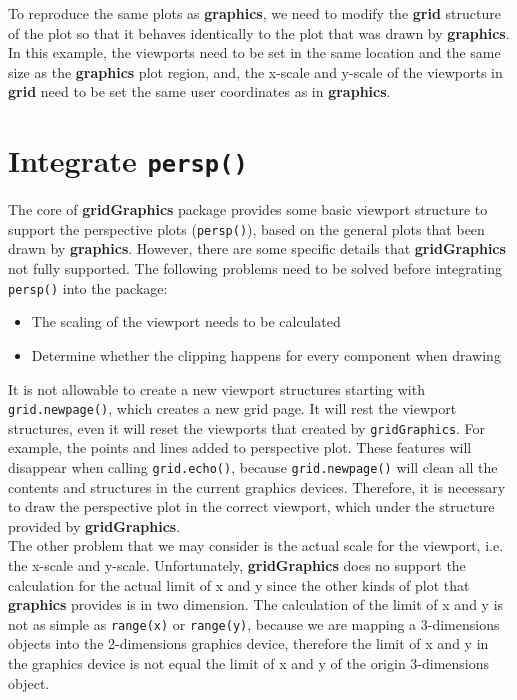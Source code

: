 \documentclass[11pt,twoside]{report}
\begin{document}
To reproduce the same plots as \textbf{graphics}, we need to modify the \textbf{grid} structure of the plot so that it behaves identically to the plot that was drawn by \textbf{graphics}. In this example, the viewports need to be set in the same location and the same size as the \textbf{graphics} plot region, and, the x-scale and y-scale of the viewports in \textbf{grid} need to be set the same user coordinates as in \textbf{graphics}.\\

\section{Integrate \texttt{persp()}}
The core of \textbf{gridGraphics} package provides some basic viewport structure to support the perspective plots (\texttt{persp()}), based on the general plots that been drawn by \textbf{graphics}. However, there are some specific details that \textbf{gridGraphics} not fully supported.
The following problems need to be solved before integrating \texttt{persp()} into the package:
\begin{itemize}
	\item{The scaling of the viewport needs to be calculated}
	\item{Determine whether the clipping happens for every component when drawing}
\end{itemize}

It is not allowable to create a new viewport structures starting with \texttt{grid.newpage()}, which creates a new grid page. It will rest the viewport structures, even it will reset the viewports that created by \texttt{gridGraphics}.
For example, the points and lines added to perspective plot. These features will disappear when calling \texttt{grid.echo()}, because \texttt{grid.newpage()} will clean all the contents and structures in the current graphics devices. Therefore, it is necessary to draw the perspective plot in the correct viewport, which under the structure provided by \textbf{gridGraphics}.\\

The other problem that we may consider is the actual scale for the viewport, i.e. the x-scale and y-scale. Unfortunately, \textbf{gridGraphics} does no support the calculation for the actual limit of x and y since the other kinds of plot that \textbf{graphics} provides is in two dimension. The calculation of the limit of x and y is not as simple as \texttt{range(x)} or \texttt{range(y)}, because we are mapping a 3-dimensions objects into the 2-dimensions graphics device, therefore the limit of x and y in the graphics device is not equal the limit of x and y of the origin 3-dimensions object.\\
\end{document}
